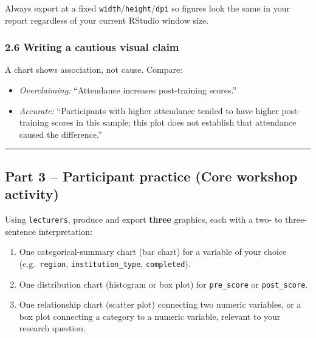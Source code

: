 \documentclass[11pt]{article}
\providecommand{\tightlist}{%
  \setlength{\itemsep}{0pt}\setlength{\parskip}{0pt}}
\begin{document}
Always export at a fixed \texttt{width}/\texttt{height}/\texttt{dpi} so
figures look the same in your report regardless of your current RStudio
window size.

\hypertarget{writing-a-cautious-visual-claim}{%
\subsubsection{2.6 Writing a cautious visual
claim}\label{writing-a-cautious-visual-claim}}

A chart shows association, not cause. Compare:

\begin{itemize}
\tightlist
\item
  \emph{Overclaiming:} ``Attendance increases post-training scores.''
\item
  \emph{Accurate:} ``Participants with higher attendance tended to have
  higher post-training scores in this sample; this plot does not
  establish that attendance caused the difference.''
\end{itemize}

\begin{center}\rule{0.5\linewidth}{0.5pt}\end{center}

\hypertarget{part-3-participant-practice-core-workshop-activity}{%
\subsection{Part 3 -- Participant practice (Core workshop
activity)}\label{part-3-participant-practice-core-workshop-activity}}

Using \texttt{lecturers}, produce and export \textbf{three} graphics,
each with a two- to three-sentence interpretation:

\begin{enumerate}
\def\labelenumi{\arabic{enumi}.}
\tightlist
\item
  One categorical-summary chart (bar chart) for a variable of your
  choice (e.g.~\texttt{region}, \texttt{institution\_type},
  \texttt{completed}).
\item
  One distribution chart (histogram or box plot) for \texttt{pre\_score}
  or \texttt{post\_score}.
\item
  One relationship chart (scatter plot) connecting two numeric
  variables, or a box plot connecting a category to a numeric variable,
  relevant to your research question.
\end{enumerate}
\end{document}
